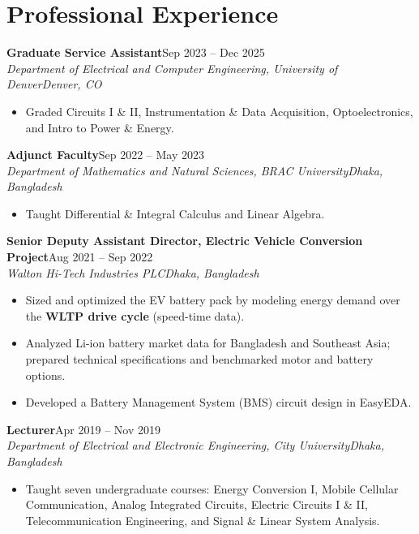 \documentclass[10pt,letterpaper]{article}
\newcommand{\entry}[4]{\textbf{#1}\hfill #2\\\textit{#3}\hfill\textit{#4}\par}
\begin{document}
\section*{Professional Experience}
\entry{Graduate Service Assistant}{Sep 2023 – Dec 2025}{Department of Electrical and Computer Engineering, University of Denver}{Denver, CO}
\begin{itemize}\item Graded Circuits I \& II, Instrumentation \& Data Acquisition, Optoelectronics, and Intro to Power \& Energy.\end{itemize}
\vspace{2pt}
\entry{Adjunct Faculty}{Sep 2022 – May 2023}{Department of Mathematics and Natural Sciences, BRAC University}{Dhaka, Bangladesh}
\begin{itemize}\item Taught Differential \& Integral Calculus and Linear Algebra.\end{itemize}
\vspace{2pt}
\entry{Senior Deputy Assistant Director, Electric Vehicle Conversion Project}{Aug 2021 – Sep 2022}{Walton Hi-Tech Industries PLC}{Dhaka, Bangladesh}
\begin{itemize}\item Sized and optimized the EV battery pack by modeling energy demand over the \textbf{WLTP drive cycle} (speed-time data).\item Analyzed Li-ion battery market data for Bangladesh and Southeast Asia; prepared technical specifications and benchmarked motor and battery options.\item Developed a Battery Management System (BMS) circuit design in EasyEDA.\end{itemize}
\vspace{2pt}
\entry{Lecturer}{Apr 2019 – Nov 2019}{Department of Electrical and Electronic Engineering, City University}{Dhaka, Bangladesh}
\begin{itemize}\item Taught seven undergraduate courses: Energy Conversion I, Mobile Cellular Communication, Analog Integrated Circuits, Electric Circuits I \& II, Telecommunication Engineering, and Signal \& Linear System Analysis.\end{itemize}
\vspace{2pt}
\end{document}
